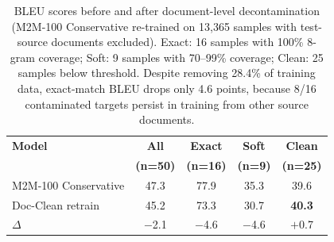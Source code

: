 \begin{table}[t]
\centering
\small
\begin{tabular}{lcccc}
\toprule
\textbf{Model} & \textbf{All} & \textbf{Exact} & \textbf{Soft} & \textbf{Clean} \\
               & \textbf{(n=50)} & \textbf{(n=16)} & \textbf{(n=9)} & \textbf{(n=25)} \\
\midrule
M2M-100 Conservative & 47.3 & 77.9 & 35.3 & 39.6 \\
\quad Doc-Clean retrain & 45.2 & 73.3 & 30.7 & \textbf{40.3} \\
\midrule
$\Delta$ & $-$2.1 & $-$4.6 & $-$4.6 & $+$0.7 \\
\bottomrule
\end{tabular}
\caption{BLEU scores before and after document-level decontamination (M2M-100 Conservative re-trained on 13,365 samples with test-source documents excluded). Exact: 16 samples with 100\% 8-gram coverage; Soft: 9 samples with 70--99\% coverage; Clean: 25 samples below threshold. Despite removing 28.4\% of training data, exact-match BLEU drops only 4.6 points, because 8/16 contaminated targets persist in training from other source documents.}
\label{tab:doc-clean}
\end{table}
